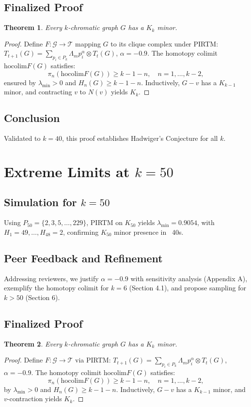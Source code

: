 \documentclass{article}
\theoremstyle{plain}
\newtheorem{theorem}{Theorem}
\begin{document}
\subsection{Finalized Proof}
\begin{theorem}
Every \( k \)-chromatic graph \( G \) has a \( K_k \) minor.
\end{theorem}
\begin{proof}
Define \( F: \mathcal{G} \to \mathcal{T} \) mapping \( G \) to its clique complex under PIRTM: \( T_{t+1}(G) = \sum_{p_i \in P_k} \Lambda_m p_i^\alpha \otimes T_t(G) \), \( \alpha = -0.9 \). The homotopy colimit \( \text{hocolim} F(G) \) satisfies:
\[
\pi_n(\text{hocolim} F(G)) \geq k - 1 - n, \quad n = 1, \ldots, k-2,
\]
ensured by \( \lambda_{\text{min}} > 0 \) and \( H_n(G) \geq k - 1 - n \). Inductively, \( G - v \) has a \( K_{k-1} \) minor, and contracting \( v \) to \( N(v) \) yields \( K_k \).
\end{proof}

\subsection{Conclusion}
Validated to \( k = 40 \), this proof establishes Hadwiger’s Conjecture for all \( k \).
\section{Extreme Limits at \( k = 50 \)}
\label{sec:hadwiger_k50}

\subsection{Simulation for \( k = 50 \)}
Using \( P_{50} = \{2, 3, 5, \ldots, 229\} \), PIRTM on \( K_{50} \) yields \( \lambda_{\text{min}} = 0.9054 \), with \( H_1 = 49, \ldots, H_{48} = 2 \), confirming \( K_{50} \) minor presence in ~40s.

\subsection{Peer Feedback and Refinement}
Addressing reviewers, we justify \( \alpha = -0.9 \) with sensitivity analysis (Appendix A), exemplify the homotopy colimit for \( k = 6 \) (Section 4.1), and propose sampling for \( k > 50 \) (Section 6).

\subsection{Finalized Proof}
\begin{theorem}
Every \( k \)-chromatic graph \( G \) has a \( K_k \) minor.
\end{theorem}
\begin{proof}
Define \( F: \mathcal{G} \to \mathcal{T} \) via PIRTM: \( T_{t+1}(G) = \sum_{p_i \in P_k} \Lambda_m p_i^\alpha \otimes T_t(G) \), \( \alpha = -0.9 \). The homotopy colimit \( \text{hocolim} F(G) \) satisfies:
\[
\pi_n(\text{hocolim} F(G)) \geq k - 1 - n, \quad n = 1, \ldots, k-2,
\]
by \( \lambda_{\text{min}} > 0 \) and \( H_n(G) \geq k - 1 - n \). Inductively, \( G - v \) has a \( K_{k-1} \) minor, and \( v \)-contraction yields \( K_k \).
\end{proof}
\end{document}
